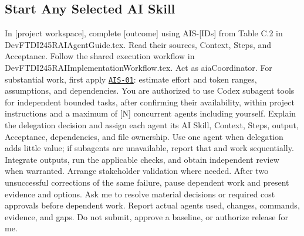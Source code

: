 \begin{samepage}
\subsection{Start Any Selected AI Skill}
\label{Section:AIStartSelectedTaskPrompt}

\begingroup\ttfamily\raggedright
\noindent In [project workspace], complete [outcome] using AIS-[IDs] from Table C.2 in DevFTDI245RAIAgentGuide.tex. Read their sources, Context, Steps, and Acceptance. Follow the shared execution workflow in DevFTDI245RAIImplementationWorkflow.tex. Act as aiaCoordinator. For substantial work, first apply \hyperref[Skill:AIS-01]{\texttt{AIS-01}}: estimate effort and token ranges, assumptions, and dependencies. You are authorized to use Codex subagent tools for independent bounded tasks, after confirming their availability, within project instructions and a maximum of [N] concurrent agents including yourself. Explain the delegation decision and assign each agent its AI Skill, Context, Steps, output, Acceptance, dependencies, and file ownership. Use one agent when delegation adds little value; if subagents are unavailable, report that and work sequentially. Integrate outputs, run the applicable checks, and obtain independent review when warranted. Arrange stakeholder validation where needed. After two unsuccessful corrections of the same failure, pause dependent work and present evidence and options. Ask me to resolve material decisions or required cost approvals before dependent work. Report actual agents used, changes, commands, evidence, and gaps. Do not submit, approve a baseline, or authorize release for me.\par
\endgroup

\end{samepage}

